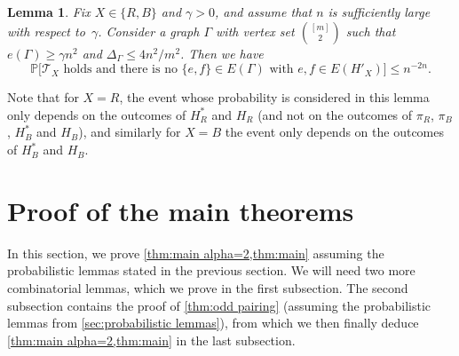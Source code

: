 \documentclass[11pt,reqno,oneside]{amsart}
\newtheorem{lemma}[theorem]{Lemma}
\theoremstyle{definition}
\newcommand\1{\mathbf{1}}
\let\leq\leqslant
\let\geq\geqslant
\begin{document}
 \begin{lemma}\label{lemma: one connection survives}
    Fix $X\in \{R,B\}$ and $\gamma>0$, and assume that $n$ is sufficiently large with respect to~$\gamma$. Consider a graph $\Gamma$ with vertex set $\binom{[m]}2$ such that $e(\Gamma)\geq \gamma n^2$ and $\Delta_\Gamma\leq 4n^2/m^2$. Then we have
    \[\mathbb P\big[\mathcal T_X\text{ holds and there is no }\{e,f\} \in E(\Gamma)\text{ with }e,f \in E(H'_X)\big] \leq n^{-2n}.\]
\end{lemma}

Note that for $X=R$, the event whose probability is considered in this lemma only depends on the outcomes of $H_R^*$ and $H_R$ (and not on the outcomes of $\pi_R$, $\pi_B$, $H_B^*$ and $H_B$), and similarly for $X=B$ the event only depends on the outcomes of $H_B^*$ and $H_B$.


\section{Proof of the main theorems}\label{sec:main proof}

In this section, we prove \cref{thm:main alpha=2,thm:main} assuming the probabilistic lemmas stated in the previous section. We will need two more combinatorial lemmas, which we prove in the first subsection. The second subsection contains the proof of \cref{thm:odd pairing} (assuming the probabilistic lemmas from \cref{sec:probabilistic lemmas}), from which we then finally deduce \cref{thm:main alpha=2,thm:main} in the last subsection.
\end{document}

